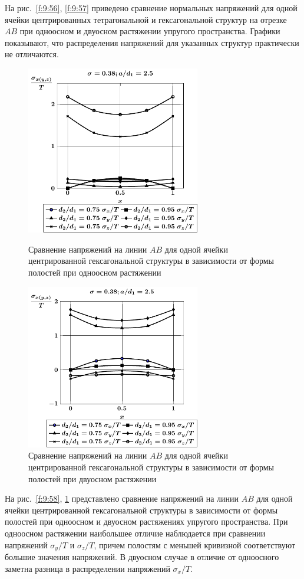 На рис.~\ref{f:9:56}, \ref{f:9:57} приведено сравнение нормальных напряжений для одной ячейки центрированных тетрагональной и гексагональной структур на отрезке $AB$ при одноосном и двуосном растяжении упругого пространства. Графики показывают, что распределения напряжений для указанных структур практически не отличаются.

\begin{figure}[h!]
\centering\footnotesize
\parbox[b]{7.5cm}{\centering\includegraphics[width=7.6cm]{cav13-d-a25-t1.pdf}
\caption{Сравнение напряжений на линии $AB$ для одной ячейки центрированной гексагональной структуры в зависимости от формы полостей при одноосном растяжении 
\label{f:9:58}}}\hfil\hfil
\parbox[b]{7.5cm}{\centering\includegraphics[width=7.6cm]{cav13-d-a25-t2.pdf}
\caption{Сравнение напряжений на линии $AB$ для одной ячейки центрированной гексагональной структуры в зависимости от формы полостей при двуосном растяжении
\label{f:9:59}}}
\end{figure}

На рис.~\ref{f:9:58}, \ref{f:9:59} представлено сравнение напряжений на линии $AB$ для одной ячейки центрированной гексагональной структуры в зависимости от формы полостей при одноосном и двуосном растяжениях упругого пространства. При одноосном растяжении наибольшее отличие наблюдается при сравнении напряжений $\sigma_y/T$ и $\sigma_z/T$, причем полостям с меньшей кривизной соответствуют большие значения напряжений. В двуосном случае в отличие от одноосного заметна разница в распределении напряжений $\sigma_x/T$.

